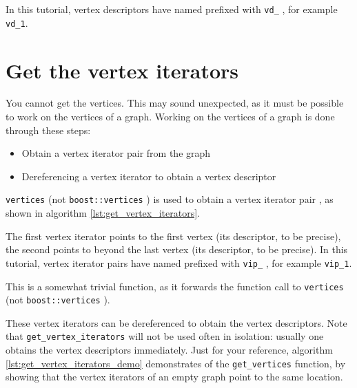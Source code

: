 In this tutorial, 
vertex descriptors have named prefixed with \verb;vd_; , 
for example \verb;vd_1;.

\section{Get the vertex iterators}
\label{subsec:get_vertices}

You cannot get the vertices.
This may sound unexpected, as it must be possible to work on the vertices
of a graph.
Working on the vertices of a graph is done through these steps:

\begin{itemize}
  \item Obtain a vertex iterator pair from the graph
  \item Dereferencing a vertex iterator to obtain a vertex descriptor 
\end{itemize}

\verb;vertices;  
(not \verb;boost::vertices; ) 
is used to obtain 
a vertex iterator pair , 
as shown in algorithm \ref{lst:get_vertex_iterators}.

The first vertex iterator 
points to the first vertex (its descriptor, to be precise), the second
points to beyond the last vertex (its descriptor, to be precise).
In this tutorial, vertex iterator pairs have named prefixed with 
\verb;vip_; , for example \verb;vip_1;.



This is a somewhat trivial function, 
as it forwards the function call to
\verb;vertices; 
(not \verb;boost::vertices; ).

These vertex iterators can be dereferenced to obtain the vertex descriptors.
Note that \verb;get_vertex_iterators; will not be used often in isolation: usually
one obtains the vertex descriptors immediately.
Just for your reference, algorithm 
\ref{lst:get_vertex_iterators_demo}
demonstrates of the \verb;get_vertices; function, by showing that the vertex
iterators of an empty graph point to the same location.

